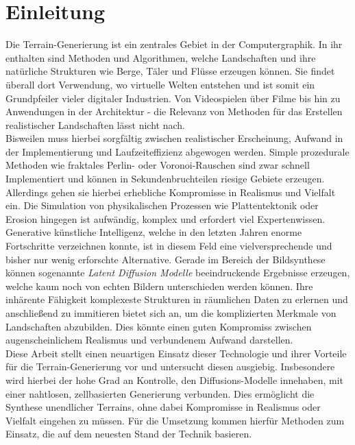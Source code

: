 \chapter{Einleitung}



Die Terrain-Generierung ist ein zentrales Gebiet in der Computergraphik. In ihr enthalten sind Methoden und Algorithmen, welche Landschaften und ihre natürliche Strukturen wie Berge, Täler und Flüsse erzeugen können. Sie findet überall dort Verwendung, wo virtuelle Welten entstehen und ist somit ein Grundpfeiler vieler digitaler Industrien. Von Videospielen über Filme bis hin zu Anwendungen in der Architektur - die Relevanz von Methoden für das Erstellen realistischer Landschaften lässt nicht nach. \\
Bisweilen muss hierbei sorgfältig zwischen realistischer Erscheinung, Aufwand in der Implementierung und Laufzeiteffizienz abgewogen werden. Simple prozedurale Methoden wie fraktales Perlin- oder Voronoi-Rauschen sind zwar schnell Implementiert und können in Sekundenbruchteilen riesige Gebiete erzeugen. Allerdings gehen sie hierbei erhebliche Kompromisse in Realismus und Vielfalt ein. Die Simulation von physikalischen Prozessen wie Plattentektonik oder Erosion hingegen ist aufwändig, komplex und erfordert viel Expertenwissen. \\
Generative künstliche Intelligenz, welche in den letzten Jahren enorme Fortschritte verzeichnen konnte, ist in diesem Feld eine vielversprechende und bisher nur wenig erforschte Alternative. Gerade im Bereich der Bildsynthese können sogenannte \textit{Latent Diffusion Modelle} beeindruckende Ergebnisse erzeugen, welche kaum noch von echten Bildern unterschieden werden können.
Ihre inhärente Fähigkeit komplexeste Strukturen in räumlichen Daten zu erlernen und anschließend zu immitieren bietet sich an, um die komplizierten Merkmale von Landschaften abzubilden. Dies könnte einen guten Kompromiss zwischen augenscheinlichem Realismus und verbundenem Aufwand darstellen. \\
Diese Arbeit stellt einen neuartigen Einsatz dieser Technologie und ihrer Vorteile für die Terrain-Generierung vor und untersucht diesen ausgiebig. Insbesondere wird hierbei der hohe Grad an Kontrolle, den Diffusions-Modelle innehaben, mit einer nahtlosen, zellbasierten Generierung verbunden. Dies ermöglicht die Synthese unendlicher Terrains, ohne dabei Kompromisse in Realismus oder Vielfalt eingehen zu müssen. Für die Umsetzung kommen hierfür Methoden zum Einsatz, die auf dem neuesten Stand der Technik basieren.
 
